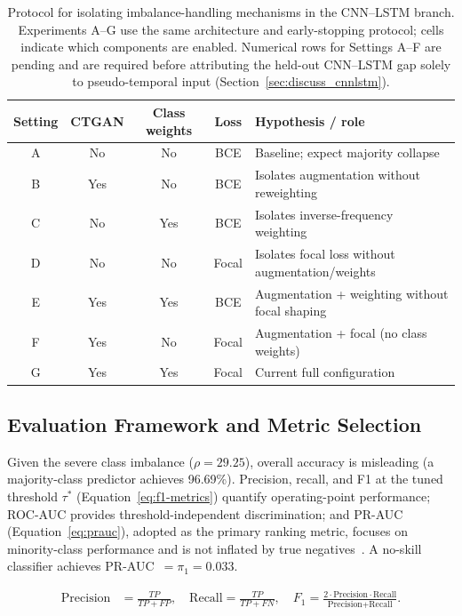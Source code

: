 \documentclass[sensors,article,submit,pdftex,moreauthors]{Definitions/mdpi}
\newcommand{\mdpitablefont}{\footnotesize}
\begin{document}
\begin{table}[H]
\caption{Protocol for isolating imbalance-handling mechanisms in the CNN--LSTM branch.
Experiments A--G use the same architecture and early-stopping protocol; cells indicate which components are enabled.
Numerical rows for Settings A--F are pending and are required before attributing the held-out CNN--LSTM gap solely to pseudo-temporal input (Section~\ref{sec:discuss_cnnlstm}).\label{tab:abl_imb}}
\centering
\mdpitablefont
\begin{tabularx}{\textwidth}{c c c c X}
\toprule
\textbf{Setting} & \textbf{CTGAN} & \textbf{Class weights} & \textbf{Loss} & \textbf{Hypothesis / role} \\
\midrule
A & No & No & BCE & Baseline; expect majority collapse \\
B & Yes & No & BCE & Isolates augmentation without reweighting \\
C & No & Yes & BCE & Isolates inverse-frequency weighting \\
D & No & No & Focal & Isolates focal loss without augmentation/weights \\
E & Yes & Yes & BCE & Augmentation + weighting without focal shaping \\
F & Yes & No & Focal & Augmentation + focal (no class weights) \\
G & Yes & Yes & Focal & Current full configuration \\
\bottomrule
\end{tabularx}
\end{table}

\subsection{Evaluation Framework and Metric Selection}
\label{sec:method_eval}

Given the severe class imbalance ($\rho{=}29.25$), overall accuracy is
misleading (a majority-class predictor achieves 96.69\%).
Precision, recall, and F1 at the tuned threshold $\tau^*$
(Equation~\ref{eq:f1-metrics}) quantify operating-point performance;
ROC-AUC provides threshold-independent discrimination; and PR-AUC
(Equation~\ref{eq:prauc}), adopted as the primary ranking metric,
focuses on minority-class performance and is not inflated by true
negatives~\citep{ref-pr-auc-imbalance2023}.
A no-skill classifier achieves PR-AUC~$= \pi_1 = 0.033$.

\begin{linenomath}
\begin{align}
\text{Precision} &= \frac{TP}{TP + FP}, \quad
\text{Recall}     = \frac{TP}{TP + FN}, \quad
F_1               = \frac{2 \cdot \text{Precision} \cdot \text{Recall}}
                         {\text{Precision} + \text{Recall}}.
\label{eq:f1-metrics}
\end{align}
\end{linenomath}
\end{document}
